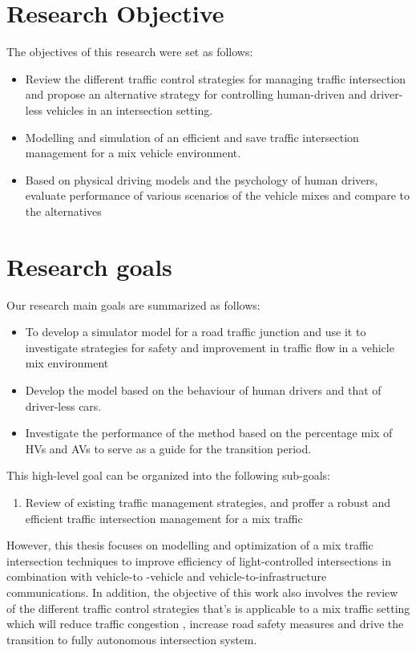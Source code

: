 \documentclass{book}
\begin{document}
\section{Research Objective}
\label{sec:objective}
The objectives of this research were set as follows:
\begin{itemize}
\item Review the different traffic control strategies for managing traffic  intersection and propose an alternative strategy for controlling human-driven and driver-less vehicles in an intersection setting.
\item Modelling and simulation of an efficient and save traffic intersection management for a mix vehicle environment.
\item Based on physical driving models and the psychology of human drivers, evaluate performance of various scenarios of the vehicle mixes and compare to the alternatives
\end{itemize}


\section{Research goals}
\label{sec:goals}
Our research main goals are summarized as follows:

\begin{itemize}
\item To develop a simulator model for a road traffic junction and use it to investigate strategies for safety and improvement in traffic flow in a vehicle mix environment
\item Develop the model based on the behaviour of human drivers and that of driver-less cars.
\item Investigate the performance of the method based on the percentage mix of HVs and AVs to serve as a guide for the transition period.
\end{itemize}

This high-level goal can be organized into the following sub-goals:
\begin{enumerate}
    \item Review of existing traffic management strategies, and proffer a robust and efficient traffic intersection management for a mix traffic
\end{enumerate}

However, this thesis focuses on modelling and optimization of a mix traffic intersection techniques to improve efficiency of light-controlled intersections in combination with vehicle-to -vehicle and vehicle-to-infrastructure communications. In addition, the objective of this work also involves the review  of the different traffic control strategies that’s is applicable to a mix  traffic setting which will reduce traffic congestion , increase road safety measures and drive the transition to fully autonomous intersection system.
\end{document}
